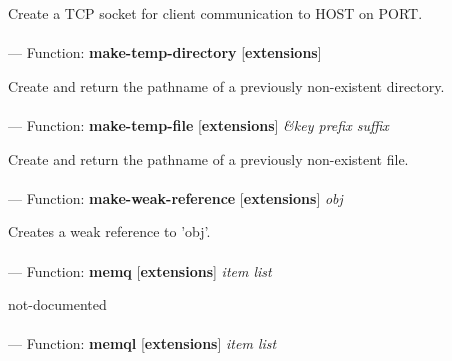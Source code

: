 \begin{adjustwidth}{5em}{5em}
Create a TCP socket for client communication to HOST on PORT.
\end{adjustwidth}

\paragraph{}
\label{EXTENSIONS:MAKE-TEMP-DIRECTORY}
--- Function: \textbf{make-temp-directory} [\textbf{extensions}] \textit{}

\begin{adjustwidth}{5em}{5em}
Create and return the pathname of a previously non-existent directory.
\end{adjustwidth}

\paragraph{}
\label{EXTENSIONS:MAKE-TEMP-FILE}
--- Function: \textbf{make-temp-file} [\textbf{extensions}] \textit{\&key prefix suffix}

\begin{adjustwidth}{5em}{5em}
Create and return the pathname of a previously non-existent file.
\end{adjustwidth}

\paragraph{}
\label{EXTENSIONS:MAKE-WEAK-REFERENCE}
--- Function: \textbf{make-weak-reference} [\textbf{extensions}] \textit{obj}

\begin{adjustwidth}{5em}{5em}
Creates a weak reference to 'obj'.
\end{adjustwidth}

\paragraph{}
\label{EXTENSIONS:MEMQ}
--- Function: \textbf{memq} [\textbf{extensions}] \textit{item list}

\begin{adjustwidth}{5em}{5em}
not-documented
\end{adjustwidth}

\paragraph{}
\label{EXTENSIONS:MEMQL}
--- Function: \textbf{memql} [\textbf{extensions}] \textit{item list}

